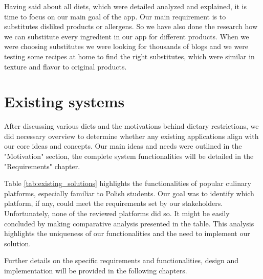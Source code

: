Having said about all diets, which were detailed analyzed and explained, it is time to focus on our main goal of the app. Our main requirement is to substitutes disliked products or allergens. So we have also done the research how we can substitute every ingredient in our app for different products. When we were choosing substitutes we were looking for thousands of blogs and we were testing some recipes at home to find the right substitutes, which were similar in texture and flavor to original products.

\section{Existing systems} 
\label{section:existing_solutions}
\newline
After discussing various diets and the motivations behind dietary restrictions, we did necessary overview to determine whether any existing applications align with our core ideas and concepts. Our main ideas and needs were outlined in the "Motivation" section, the complete system functionalities will be detailed in the "Requirements" chapter.
\par
Table \ref{tab:existing_solutions} highlights the functionalities of popular culinary platforms, especially familiar to Polish students. Our goal was to identify which platform, if any, could meet the requirements set by our stakeholders. Unfortunately, none of the reviewed platforms did so. It might be easily concluded by making comparative analysis presented in the table. This analysis highlights the uniqueness of our functionalities and the need to implement our solution.

Further details on the specific requirements and functionalities, design and implementation will be provided in the following chapters.


